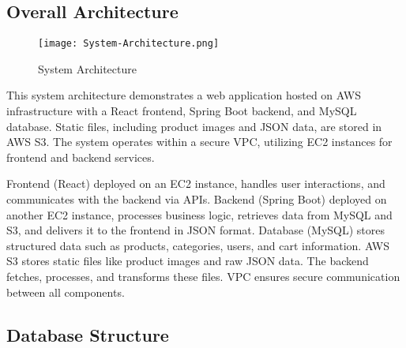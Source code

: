 \documentclass[conference]{IEEEtran}
\begin{document}
\subsection{Overall Architecture}

\begin{figure}[H]
    \centering
    \texttt{[image: System-Architecture.png]}
    \caption{System Architecture}
    \label{fig:system-architecture}
\end{figure}

This system architecture demonstrates a web application hosted on AWS infrastructure with a React frontend, Spring Boot backend, and MySQL database. Static files, including product images and JSON data, are stored in AWS S3. The system operates within a secure VPC, utilizing EC2 instances for frontend and backend services.\newline

Frontend (React) deployed on an EC2 instance, handles user interactions, and communicates with the backend via APIs.
Backend (Spring Boot) deployed on another EC2 instance, processes business logic, retrieves data from MySQL and S3, and delivers it to the frontend in JSON format.
Database (MySQL) stores structured data such as products, categories, users, and cart information.
AWS S3 stores static files like product images and raw JSON data. The backend fetches, processes, and transforms these files.
VPC ensures secure communication between all components.

\subsection{Database Structure}
\end{document}
